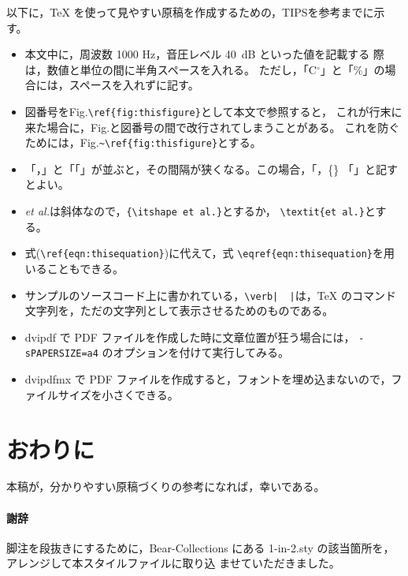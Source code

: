 \documentclass[10pt,twocolumn]{jarticle} %
\begin{document}
以下に，TeX を使って見やすい原稿を作成するための，TIPSを参考までに示す。
\begin{itemize}
\itemsep -5pt
\item 本文中に，周波数 1000 Hz，音圧レベル 40~dB といった値を記載する
際は，数値と単位の間に半角スペースを入れる。
ただし，{}「C$^\circ$」と「\%」の場合には，スペースを入れずに記す。
\item 図番号をFig.\verb|\ref{fig:thisfigure}|として本文で参照すると，
これが行末に来た場合に，Fig.と図番号の間で改行されてしまうことがある。
これを防ぐためには，Fig.\verb|~\ref{fig:thisfigure}|とする。
\item 「，」と「「」が並ぶと，その間隔が狭くなる。この場合，{}「，\{\}
「」と記すとよい。
\item \textit{et al.}は斜体なので，\verb|{\itshape et al.}|とするか，
\verb|\textit{et al.}|とする。
\item 式(\verb|\ref{eqn:thisequation}|)に代えて，式
\verb|\eqref{eqn:thisequation}|を用いることもできる。
\item サンプルのソースコード上に書かれている，\verb,\verb|  |,は，TeX
のコマンド文字列を，ただの文字列として表示させるためのものである。
\item dvipdf で PDF ファイルを作成した時に文章位置が狂う場合には，
{\tt -sPAPERSIZE=a4} のオプションを付けて実行してみる。
\item dvipdfmx で PDF ファイルを作成すると，フォントを埋め込まないので，ファイルサイズを小さくできる。
\end{itemize}

\section{おわりに}

本稿が，分かりやすい原稿づくりの参考になれば，幸いである。

\paragraph{謝辞}

脚注を段抜きにするために，Bear-Collections \cite{bear}
にある 1-in-2.sty の該当箇所を，アレンジして本スタイルファイルに取り込
ませていただきました。

\end{document}
